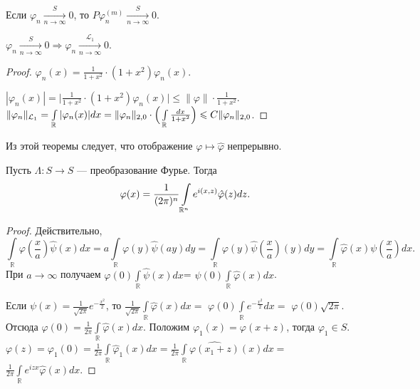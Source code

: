 \documentclass[10pt,titlepage, a4paper]{article}
\begin{document}
\begin{theorem}
Если $\varphi_n \xrightarrow[n\rightarrow \infty]{S} 0$, то
$P\varphi_{n}^{(m)} \xrightarrow[n\rightarrow \infty]{S} 0$.
\end{theorem}

\begin{theorem}
$\varphi_n \xrightarrow[n\rightarrow \infty]{S} 0 \Rightarrow
\varphi_n \xrightarrow[n\rightarrow \infty]{\mathcal{L}_1} 0$.
\end{theorem}

\begin{proof}
$\varphi_n(x)=\frac{1}{1+x^2}\cdot (1+x^2)\varphi_n(x)$.

$|\varphi_n(x)|=\Big|\frac{1}{1+x^2}\cdot
(1+x^2)\varphi_n(x)\Big|\leqslant \|\varphi\|\cdot \frac{1}{1+x^2}$.
$\|\varphi_n\|_{\mathcal{L}_1}=\int\limits_\mathbb{R}|\varphi_n(x)|dx\p=\|\varphi_n\|_{2,0}\cdot
\Big(\int\limits_\mathbb{R}\frac{dx}{1+x^2}\Big)\leqslant
C\|\varphi_n\|_{2,0}$.
\end{proof}

\begin{zam}
Из этой теоремы следует, что отображение $\varphi \mapsto \hat
\varphi$ непрерывно.
\end{zam}

\begin{theorem} Пусть $\Lambda \colon S \rightarrow S$ --- преобразование Фурье.
Тогда $$\varphi
(x)\p=\frac{1}{(2\pi)^n}\int\limits_{\mathbb{R}^n}e^{i(x,z)}\hat
\varphi(z)dz.$$
\end{theorem}

\begin{proof}
Действительно,
$$\int\limits_\mathbb{R}\varphi(\frac{x}{a})\hat\psi(x)dx=
a\int\limits_\mathbb{R}\varphi(y)\hat\psi(ay)dy=
\int\limits_\mathbb{R}\varphi(y)\hat\psi(\frac{x}{a})(y)dy=
\int\limits_\mathbb{R}\hat\varphi(x)\psi(\frac{x}{a})dx.$$ При
$a\rightarrow \infty$ получаем
$\varphi(0)\int\limits_\mathbb{R}\hat\psi(x)dx$=
$\psi(0)\int\limits_\mathbb{R}\hat\varphi(x)dx$.

Если $\psi (x)=\frac{1}{\sqrt{2\pi}}e^{-\frac{x^2}{2}}$, то
$\frac{1}{\sqrt{2\pi}}\int\limits_{\mathbb{R}}\hat\varphi (x)dx=$
$\varphi (0)\int\limits_{\mathbb{R}}e^{-\frac{x^2}{2}}dx=$ $\varphi
(0)\sqrt{2\pi}$. Отсюда $\varphi
(0)=\frac{1}{2\pi}\int\limits_{\mathbb{R}}\hat\varphi (x)dx$.
Положим $\varphi_1(x)=\varphi (x+z)$, тогда $\varphi_1\in S$.
$\varphi
(z)=\varphi_1(0)=\frac{1}{2\pi}\int\limits_{\mathbb{R}}\hat\varphi_1
(x)dx=$$\frac{1}{2\pi}\int\limits_{\mathbb{R}}\widehat{\varphi
(x_1+z)}(x)dx=$
$\frac{1}{2\pi}\int\limits_{\mathbb{R}}e^{izx}\hat\varphi (x)dx$.
\end{proof}
\end{document}
